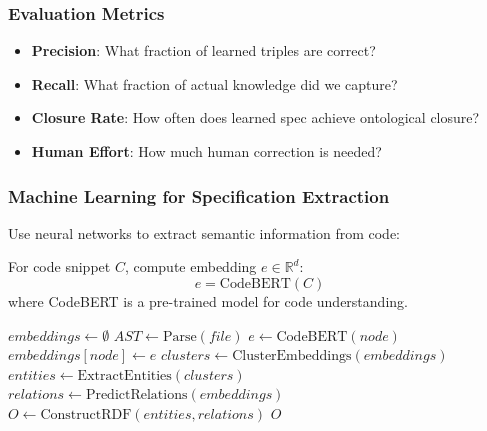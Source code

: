 \subsubsection{Evaluation Metrics}

\begin{itemize}
    \item \textbf{Precision}: What fraction of learned triples are correct?
    \item \textbf{Recall}: What fraction of actual knowledge did we capture?
    \item \textbf{Closure Rate}: How often does learned spec achieve ontological closure?
    \item \textbf{Human Effort}: How much human correction is needed?
\end{itemize}

\subsubsection{Machine Learning for Specification Extraction}

Use neural networks to extract semantic information from code:

\begin{definition}
    For code snippet $C$, compute embedding $e \in \mathbb{R}^d$:
    \begin{equation}
        e = \text{CodeBERT}(C)
    \end{equation}
    where CodeBERT is a pre-trained model for code understanding.
\end{definition}

\begin{algorithm}
\caption{Neural Specification Extraction}
\begin{algorithmic}[1]
    \State $embeddings \gets \emptyset$
        \State $AST \gets \text{Parse}(file)$
            \State $e \gets \text{CodeBERT}(node)$
            \State $embeddings[node] \gets e$
        \EndFor
    \EndFor
    \State $clusters \gets \text{ClusterEmbeddings}(embeddings)$ 
    \State $entities \gets \text{ExtractEntities}(clusters)$
    \State $relations \gets \text{PredictRelations}(embeddings)$
    \State $O \gets \text{ConstructRDF}(entities, relations)$
    \State \Return $O$
\EndProcedure
\end{algorithmic}
\end{algorithm}

